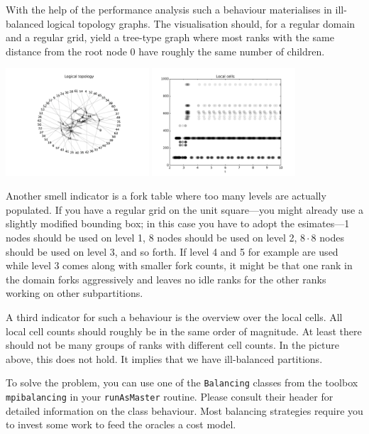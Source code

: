 {\noindent
With the help of the performance analysis such a behaviour materialises in
ill-balanced logical topology graphs.
The visualisation should, for a regular domain and a regular grid, yield a
tree-type graph where most ranks with the same distance from the root node 0
have roughly the same number of children.

\begin{center} 
  \includegraphics[width=0.4\textwidth]{62_quick-tuning/topology.pdf}
  \includegraphics[width=0.4\textwidth]{62_quick-tuning/local-cells.pdf}
\end{center}

\noindent
Another smell indicator is a fork table where too many levels are actually
populated. 
If you have a regular grid on the unit square---you might already use a slightly
modified bounding box; in this case you have to adopt the esimates---1 nodes
should be used on level 1, 8 nodes should be used on level 2, $8 \cdot 8$ nodes
should be used on level 3, and so forth.
If level 4 and 5 for example are used while level 3 comes along with smaller
fork counts, it might be that one rank in the domain forks aggressively and
leaves no idle ranks for the other ranks working on other subpartitions.

A third indicator for such a behaviour is the overview over the local cells.
All local cell counts should roughly be in the same order of magnitude. 
At least there should not be many groups of ranks with different cell counts.
In the picture above, this does not hold.
It implies that we have ill-balanced partitions.

To solve the problem, you can use one of the \texttt{Balancing} classes from the
toolbox \texttt{mpibalancing} in your \texttt{runAsMaster} routine.
Please consult their header for detailed information on the class behaviour.
Most balancing strategies require you to invest some work to feed the
oracles a cost model.



}
